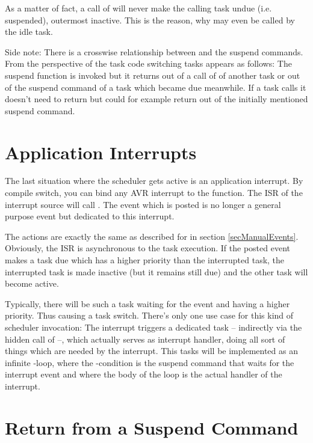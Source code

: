 As a matter of fact, a call of  will never make the
calling task undue (i.e. suspended), outermost inactive. This is the
reason, why  may even be called by the idle task.

Side note: There is a crosswise relationship between  and
the suspend commands. From the perspective of the task code switching
tasks appears as follows: The suspend function is invoked but it returns
out of a call of  of another task or out of the suspend
command of a task which became due meanwhile. If a task calls
 it doesn't need to return but could for example return
out of the initially mentioned suspend command.


\section{Application Interrupts}
\label{secInterruptEvents}

The last situation where the scheduler gets active is an application
interrupt. By compile switch, you can bind any AVR interrupt to the
 function. The ISR of the interrupt source will call
. The event which is posted is no longer a general purpose
event but dedicated to this interrupt.

The actions are exactly the same as described for  in
section \ref{secManualEvents}. Obviously, the ISR is asynchronous to the
task execution. If the posted event makes a task due which has a higher
priority than the interrupted task, the interrupted task is made inactive
(but it remains still due) and the other task will become active.

Typically, there will be such a task waiting for the event and having a
higher priority. Thus causing a task switch. There's only one use case for
this kind of scheduler invocation: The interrupt triggers a dedicated task
-- indirectly via the hidden call of  --, which actually
serves as interrupt handler, doing all sort of things which are needed by
the interrupt. This tasks will be implemented as an infinite
-loop, where the -condition is the suspend
command that waits for the interrupt event and where the body of the loop
is the actual handler of the interrupt.


\section{Return from a Suspend Command}
\label{secReturnFromSuspend}

